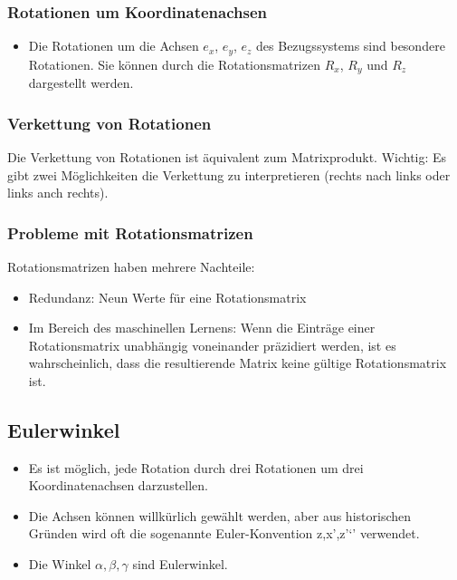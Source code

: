 \documentclass[paper=a4, fontsize=11pt]{scrartcl} %
\numberwithin{equation}{section} %
\numberwithin{figure}{section} %
\numberwithin{table}{section} %
\begin{document}
\subsubsection{Rotationen um Koordinatenachsen}

\begin{itemize}
\item Die Rotationen um die Achsen $e_x$, $e_y$, $e_z$ des Bezugssystems sind besondere Rotationen. Sie können durch die Rotationsmatrizen $R_x$, $R_y$ und $R_z$ dargestellt werden.
\end{itemize}

\subsubsection{Verkettung von Rotationen}

Die Verkettung von Rotationen ist äquivalent zum Matrixprodukt. Wichtig: Es gibt zwei Möglichkeiten die Verkettung zu interpretieren (rechts nach links oder links anch rechts).

\subsubsection{Probleme mit Rotationsmatrizen}

Rotationsmatrizen haben mehrere Nachteile:
\begin{itemize}
\item Redundanz: Neun Werte für eine Rotationsmatrix
\item Im Bereich des maschinellen Lernens: Wenn die Einträge einer Rotationsmatrix unabhängig voneinander präzidiert werden, ist es wahrscheinlich, dass die resultierende Matrix keine gültige Rotationsmatrix ist.
\end{itemize}

\subsection{Eulerwinkel}

\begin{itemize}
\item Es ist möglich, jede Rotation durch drei Rotationen um drei Koordinatenachsen darzustellen.
\item Die Achsen können willkürlich gewählt werden, aber aus historischen Gründen wird oft die sogenannte Euler-Konvention z,x',z'`' verwendet.
\item Die Winkel $\alpha,\beta,\gamma$ sind Eulerwinkel.
\end{itemize}
\end{document}
